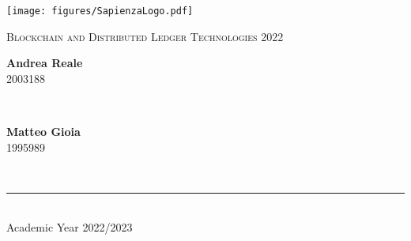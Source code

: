 \begin{titlepage}
	\centering
	\vspace*{0.5 cm}
	\texttt{[image: figures/SapienzaLogo.pdf]}\\[1.0 cm]	%

	{ \fontsize{20.74pt}{18.5pt}\selectfont\bfseries \thetitle \par } %

	\vspace*{0.25cm}
	\textsc{\Large Blockchain and Distributed Ledger Technologies 2022}\\[0.5 cm] %

	\vspace*{2.6cm}
	\hspace{3em}
	\begin{minipage}{0.3\textwidth} %
		\begin{flushleft} \large
			\textbf{Andrea Reale}\\
			2003188\\
		\end{flushleft}
	\end{minipage}~
	\hspace{3em}
	\begin{minipage}{0.3\textwidth} %
		\begin{flushright} \large
			\begin{minipage}{1\textwidth}
				\begin{flushleft} \large
					\textbf{Matteo Gioia} \\
					1995989
				\end{flushleft}
			\end{minipage}
		\end{flushright}
	\end{minipage}\\[3.85 cm]

	\vspace{8cm}
	\rule{\linewidth}{0.2 mm} \\[0.3 cm]
	Academic Year 2022/2023
\end{titlepage}
